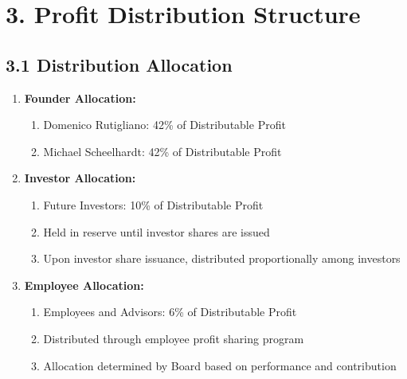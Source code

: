 \section*{3. Profit Distribution Structure}

\subsection*{3.1 Distribution Allocation}
\begin{enumerate}[label=\arabic*.]
\item \textbf{Founder Allocation:}
    \begin{enumerate}[label=(\alph*)]
    \item Domenico Rutigliano: 42\% of Distributable Profit
    \item Michael Scheelhardt: 42\% of Distributable Profit
    \end{enumerate}

\item \textbf{Investor Allocation:}
    \begin{enumerate}[label=(\alph*)]
    \item Future Investors: 10\% of Distributable Profit
    \item Held in reserve until investor shares are issued
    \item Upon investor share issuance, distributed proportionally among investors
    \end{enumerate}

\item \textbf{Employee Allocation:}
    \begin{enumerate}[label=(\alph*)]
    \item Employees and Advisors: 6\% of Distributable Profit
    \item Distributed through employee profit sharing program
    \item Allocation determined by Board based on performance and contribution
    \end{enumerate}
\end{enumerate}

